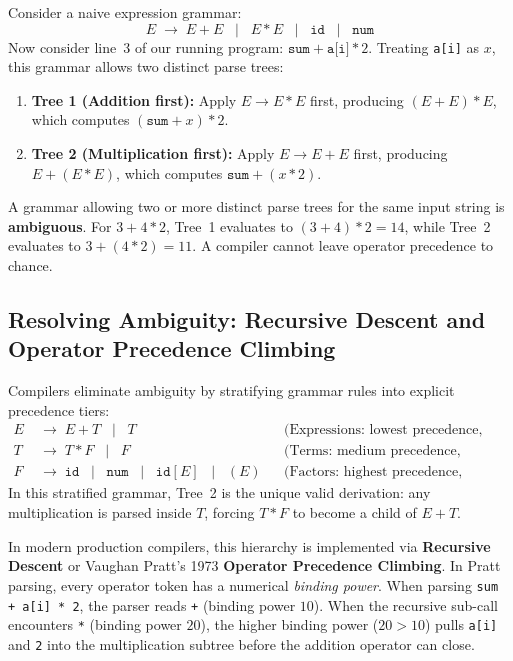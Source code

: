 Consider a naive expression grammar:
\[
  E \;\to\; E + E \;\;\mid\;\; E * E \;\;\mid\;\; \texttt{id} \;\;\mid\;\; \texttt{num}
\]
Now consider line~3 of our running program: $\texttt{sum} + \texttt{a[i]} * 2$.
Treating \texttt{a[i]} as $x$, this grammar allows two distinct parse trees:
\begin{enumerate}
  \item \textbf{Tree 1 (Addition first):} Apply $E \to E * E$ first, producing
  $(E + E) * E$, which computes $(\texttt{sum} + x) * 2$.
  \item \textbf{Tree 2 (Multiplication first):} Apply $E \to E + E$ first,
  producing $E + (E * E)$, which computes $\texttt{sum} + (x * 2)$.
\end{enumerate}

\begin{trapbox}
A grammar allowing two or more distinct parse trees for the same input string is
\textbf{ambiguous}. For $3 + 4 * 2$, Tree~1 evaluates to $(3 + 4) * 2 = 14$,
while Tree~2 evaluates to $3 + (4 * 2) = 11$. A compiler cannot leave operator
precedence to chance.
\end{trapbox}

\subsection{Resolving Ambiguity: Recursive Descent and Operator Precedence Climbing}

Compilers eliminate ambiguity by stratifying grammar rules into explicit
precedence tiers:
\begin{align*}
  E &\;\to\; E + T \;\;\mid\;\; T && \text{(Expressions: lowest precedence, addition)} \\
  T &\;\to\; T * F \;\;\mid\;\; F && \text{(Terms: medium precedence, multiplication)} \\
  F &\;\to\; \texttt{id} \;\;\mid\;\; \texttt{num} \;\;\mid\;\; \texttt{id}[E] \;\;\mid\;\; (E) && \text{(Factors: highest precedence, primary atoms)}
\end{align*}
In this stratified grammar, Tree~2 is the unique valid derivation: any
multiplication is parsed inside $T$, forcing $T * F$ to become a child of $E + T$.

In modern production compilers, this hierarchy is implemented via
\textbf{Recursive Descent} or Vaughan Pratt's 1973 \textbf{Operator Precedence
Climbing}. In Pratt parsing, every operator token has a numerical \emph{binding
power}. When parsing \texttt{sum + a[i] * 2}, the parser reads \texttt{+} (binding
power $10$). When the recursive sub-call encounters \texttt{*} (binding power
$20$), the higher binding power ($20 > 10$) pulls \texttt{a[i]} and \texttt{2}
into the multiplication subtree before the addition operator can close.

